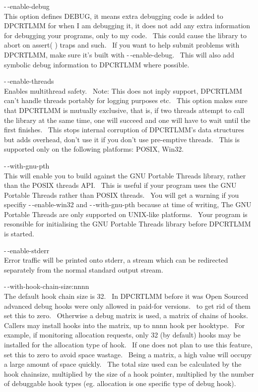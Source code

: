 \documentclass{article}
\begin{document}
\par -$\,$-enable-debug
\\
This option defines DEBUG, it means extra debugging code is added to
DPCRTLMM for when I am debugging it, it does not add any extra
information
for debugging your programs, only to my code.~ This could cause
the
library to abort on assert( ) traps and such.~ If you want to help
submit problems with DPCRTLMM, make sure it's built with
-$\,$-enable-debug.~
This will also add symbolic debug information to DPCRTLMM where
possible.\\

\par -$\,$-enable-threads
\\
Enables multithread safety.~ Note: This does not inply support,
DPCRTLMM can't handle threads portably for logging purposes etc.~
This option makes sure that DPCRTLMM is mutually exclusive, that is, if
two threads attempt to call the library at the same time, one will
succeed
and one will have to wait until the first finishes.~ This stops
internal
corruption of DPCRTLMM's data structures but adds overhead, don't use
it
if you don't use pre-emptive threads.~ This is supported only on
the
following platforms: POSIX, Win32.\\

\par -$\,$-with-gnu-pth\\
This will enable you to build against the GNU Portable Threads library,
rather than the POSIX threads API.~ This is useful if your program
uses the GNU Portable Threads rather than POSIX threads.~ You will
get a warning if you specifiy -$\,$-enable-win32 and -$\,$-with-gnu-pth because
at time of writing, The GNU Portable Threads are only supported on
UNIX-like platforms.~ Your program is resonsible for initialising
the GNU Portable Threads library before DPCRTLMM is started.\\

\par -$\,$-enable-stderr
\\
Error traffic will be printed onto stderr, a stream which can be
redirected separately from the normal standard output stream.\\

\par -$\,$-with-hook-chain-size:nnnn
\\
The default hook chain size is 32.~ In DPCRTLMM before it was
Open Sourced advanced debug hooks were only allowed in paid-for
versions.~
to get rid of them set this to zero.~ Otherwise a debug matrix is
used, a matrix of chains of hooks.~ Callers may install hooks into
the matrix, up to nnnn hook per hooktype.~ For example, if
monitoring
allocation requests, only 32 (by default) hooks may be installed for
the
allocation type of hook.~ If one does not plan to use this
feature,
set this to zero to avoid space wastage.~ Being a matrix, a high
value will occupy a large amount of space quickly.~ The total size
used can be calculated by the hook chainsize, multiplied by the size of
a hook pointer, multiplied by the number of debuggable hook types (eg.
allocation is one specific type of debug hook).\\
\end{document}
